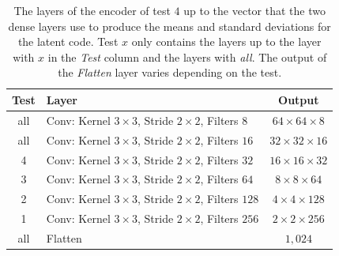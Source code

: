\begin{center}
    \begin{table}[H] 
        \centering
        \begin{tabular}{ | c | l | c | }
            \hline
            Test &Layer & Output\\ \hline
            all &Conv: Kernel $3\times3$, Stride $2\times2$, Filters $8  $    & $64\times 64\times 8  $    \\  
            all &Conv: Kernel $3\times3$, Stride $2\times2$, Filters $16 $    & $32\times 32\times 16 $    \\
            4   &Conv: Kernel $3\times3$, Stride $2\times2$, Filters $32 $    & $16\times 16\times 32 $    \\
            3   &Conv: Kernel $3\times3$, Stride $2\times2$, Filters $64 $    & $8\times 8\times   64 $    \\
            2   &Conv: Kernel $3\times3$, Stride $2\times2$, Filters $128$    & $4\times 4\times   128$    \\
            1   &Conv: Kernel $3\times3$, Stride $2\times2$, Filters $256$    & $2\times 2\times   256$    \\
            all &Flatten                                                              & $1,024$                    \\
            \hline
        \end{tabular} 
        \caption{The layers of the encoder of test $4$ up to the vector that the two dense layers use to produce 
        the means and standard deviations for the latent code. Test $x$ only contains the layers up to
        the layer with $x$ in the \textit{Test} column and the layers with \textit{all}.
        The output of the \textit{Flatten} layer
        varies depending on the test.} \label{table_encoder_num_conv}
    \end{table}
\end{center}
\vspace{-4em}
